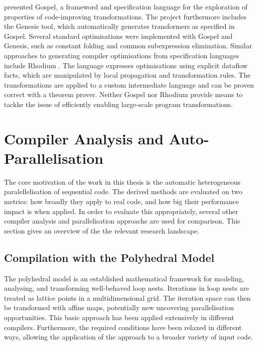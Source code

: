     \citet{Whitfield:1997:AEC:267959.267960} presented Gospel, a frameword and
    specification language for the exploration of properties of code-improving
    transformations.
    The project furthermore includes the Genesis tool, which automatically
    generates transformers as specified in Gospel.
    Several standard optimisations were implemented with Gospel and Genesis,
    such as constant folding and common subexpression elimination.
    Similar approaches to generating compiler optimisations from specification
    languages include Rhodium \citep{Lerner:2005:ASP:1040305.1040335}.
    The language expresses optimisations using explicit dataflow facts, which
    are manipulated by local propagation and transformation rules.
    The transformations are applied to a custom intermediate language and can
    be proven correct with a theorem prover.
    Neither Gospel nor Rhodium provide means to tackke the issue of efficiently
    enabling large-scale program transformations.

\section{Compiler Analysis and Auto-Parallelisation}

    The core motivation of the work in this thesis is the automatic
    heterogeneous paralellelisation of sequential code.
    The derived methods are evaluated on two metrics: how broadly they apply to
    real code, and how big their performance impact is when applied.
    In order to evaluate this appropriately, several other compiler analysis
    and parallelisation approachs are used for comparison.
    This section gives an overview of the the relevant research landscape.

\subsection{Compilation with the Polyhedral Model}

    The polyhedral model \citep{Karp:1967:OCU:321406.321418} is an established
    mathematical framework for modeling, analysing, and transforming
    well-behaved loop nests.
    Iterations in loop nests are treated as lattice points in a multidimensional
    grid.
    The iteration space can then be transformed with affine maps, potentially
    new uncovering parallelisation opportunities.
    This basic approach has been applied extensively in different compilers.
    Furthermore, the required conditions have been relaxed in different ways,
    allowing the application of the approach to a broader variety of input code.

